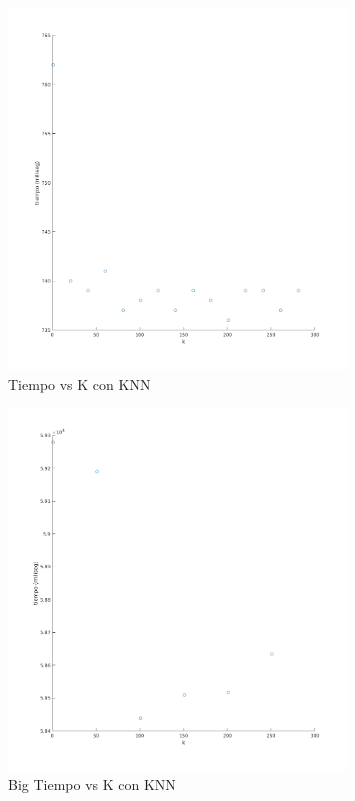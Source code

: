 \begin{figure}[H]
	\centering	\includegraphics[width=0.8\textwidth]{img/k_knn_tiempo.png}
	\caption{Tiempo vs K con KNN}
	\label{fig:K vs Tiempo con KNN}
\end{figure}
\begin{figure}[H]
	\centering	\includegraphics[width=0.8\textwidth]{img/big_k_knn_tiempo.png}
	\caption{Big Tiempo vs K con KNN}
	\label{fig:Big K vs Tiempo con KNN}
\end{figure}

